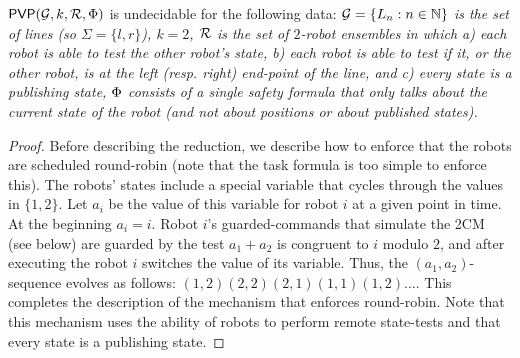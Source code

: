 \begin{theorem} \label{thm:undec-synchline}
$\mathsf{PVP}(\mathcal{G},k,\mathcal{R},\Phi)$ is undecidable for the following data:
\it
\- $\mathcal{G} = \{L_n : n \in \mathbb{N}\}$ is the set of lines (so $\Sigma = \{l,r\}$),
\- $k = 2$,
\- $\mathcal{R}$ is the set of $2$-robot ensembles in which a) each robot is able to test the other robot's state, b) each robot is able to test if it, or the other robot, is at the left (resp. right) end-point of the line, and 
c) every state is a publishing state,
\- $\Phi$ consists of a single \RLTL safety formula that only talks about the current state of the robot (and not about positions or about published states).
\ti
\end{theorem}
\begin{proof}
Before describing the reduction, we describe how to enforce that the robots are scheduled round-robin (note that the task formula is too simple to enforce this).
The robots' states include a special variable that cycles through the values in $\{1,2\}$. Let $a_i$ be the value of this variable for robot $i$ at a given point in time. At the beginning $a_i = i$. Robot $i$'s guarded-commands that simulate the 2CM (see below) are guarded by the test $a_1 + a_2$ is congruent to $i$ modulo $2$, and after executing the 
robot $i$ switches the value of its variable. 
Thus, the $(a_1,a_2)$-sequence evolves as follows: $(1,2) (2,2) (2,1) (1,1) (1,2) \dots$. 
This completes the description of the mechanism that enforces round-robin. Note that this mechanism uses the ability of robots to
perform remote state-tests and that every state is a publishing state. 


\end{proof}
